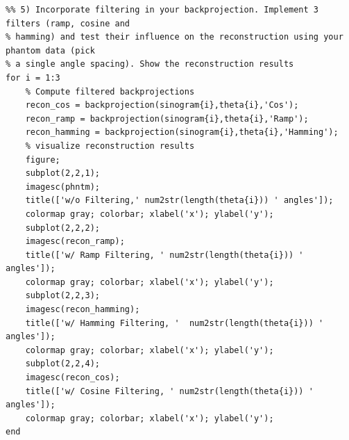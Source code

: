 \begin{lstlisting}
%% 5) Incorporate filtering in your backprojection. Implement 3 filters (ramp, cosine and
% hamming) and test their influence on the reconstruction using your phantom data (pick
% a single angle spacing). Show the reconstruction results
for i = 1:3
    % Compute filtered backprojections
    recon_cos = backprojection(sinogram{i},theta{i},'Cos');
    recon_ramp = backprojection(sinogram{i},theta{i},'Ramp');
    recon_hamming = backprojection(sinogram{i},theta{i},'Hamming');
    % visualize reconstruction results
    figure;
    subplot(2,2,1);
    imagesc(phntm);
    title(['w/o Filtering,' num2str(length(theta{i})) ' angles']);
    colormap gray; colorbar; xlabel('x'); ylabel('y');
    subplot(2,2,2);
    imagesc(recon_ramp);
    title(['w/ Ramp Filtering, ' num2str(length(theta{i})) ' angles']);
    colormap gray; colorbar; xlabel('x'); ylabel('y');
    subplot(2,2,3);
    imagesc(recon_hamming);
    title(['w/ Hamming Filtering, '  num2str(length(theta{i})) ' angles']);
    colormap gray; colorbar; xlabel('x'); ylabel('y');
    subplot(2,2,4);
    imagesc(recon_cos);
    title(['w/ Cosine Filtering, ' num2str(length(theta{i})) ' angles']);
    colormap gray; colorbar; xlabel('x'); ylabel('y');
end
\end{lstlisting}

